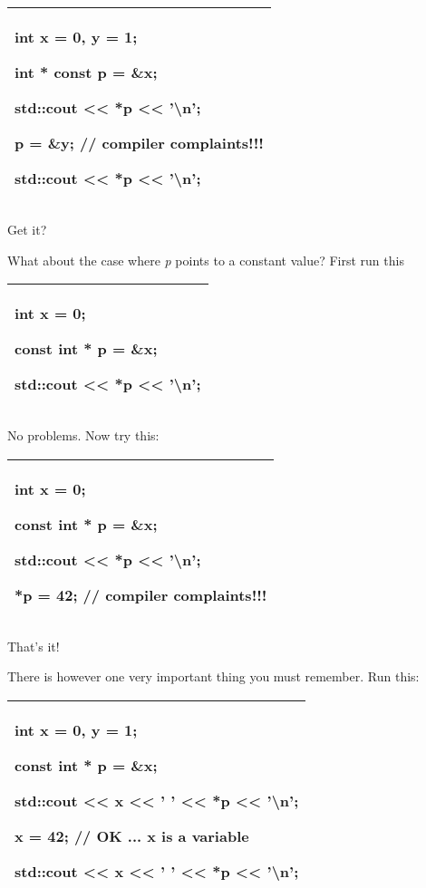 \documentclass[
]{article}
\begin{document}
\begin{longtable}[]{@{}l@{}}
\toprule
\endhead
\begin{minipage}[t]{0.97\columnwidth}\raggedright
int x = 0, y = 1;

int * \textbf{const} p = \&x;

std::cout \textless\textless{} *p \textless\textless{}
'\textbackslash n';

p = \&y; // compiler complaints!!!

std::cout \textless\textless{} *p \textless\textless{}
'\textbackslash n'; \strut
\end{minipage}\tabularnewline
\bottomrule
\end{longtable}

Get it?

What about the case where \emph{p} points to a constant value? First run
this

\begin{longtable}[]{@{}l@{}}
\toprule
\endhead
\begin{minipage}[t]{0.97\columnwidth}\raggedright
int x = 0;

\textbf{const} int * p = \&x;

std::cout \textless\textless{} *p \textless\textless{}
'\textbackslash n';\strut
\end{minipage}\tabularnewline
\bottomrule
\end{longtable}

No problems. Now try this:

\begin{longtable}[]{@{}l@{}}
\toprule
\endhead
\begin{minipage}[t]{0.97\columnwidth}\raggedright
int x = 0;

\textbf{const} int * p = \&x;

std::cout \textless\textless{} *p \textless\textless{}
'\textbackslash n';

*p = 42; // compiler complaints!!!\strut
\end{minipage}\tabularnewline
\bottomrule
\end{longtable}

That's it!

There is however one very important thing you must remember. Run this:

\begin{longtable}[]{@{}l@{}}
\toprule
\endhead
\begin{minipage}[t]{0.97\columnwidth}\raggedright
int x = 0, y = 1;

\textbf{const} int * p = \&x;

std::cout \textless\textless{} x \textless\textless{} ' '
\textless\textless{} *p \textless\textless{} '\textbackslash n';

x = 42; // OK ... x is a variable

std::cout \textless\textless{} x \textless\textless{} ' '
\textless\textless{} *p \textless\textless{} '\textbackslash n';\strut
\end{minipage}\tabularnewline
\bottomrule
\end{longtable}
\end{document}
